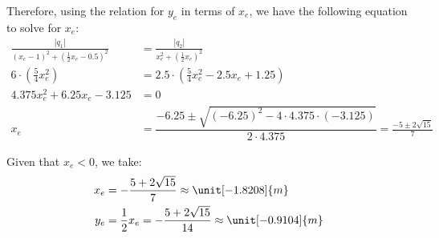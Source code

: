 \begin{ejercicio}
\begin{description}
        Therefore, using the relation for $y_e$ in terms of $x_e$, we have the following equation to solve for $x_e$:
        \begin{align*}
            \frac{|q_1|}{(x_e - 1)^2 + \left(\frac{1}{2} x_e - 0.5\right)^2} &= \frac{|q_2|}{x_e^2 + \left(\frac{1}{2} x_e\right)^2}\\
            6\cdot \left(\frac{5}{4} x_e^2\right) &= 2.5 \cdot \left( \frac{5}{4}x_e^2 -2.5 x_e + 1.25 \right)\\
            4.375 x_e^2 + 6.25 x_e - 3.125 &= 0\\
            x_e &= \dfrac{-6.25 \pm \sqrt{(-6.25)^2 - 4\cdot 4.375 \cdot (-3.125)}}{2\cdot 4.375} = \frac{-5\pm 2\sqrt{15}}{7}
        \end{align*}

        Given that $x_e<0$, we take:
        \begin{align*}
            x_e &= -\frac{5+ 2\sqrt{15}}{7} \approx \unit[-1.8208]{m}\\
            y_e &= \frac{1}{2} x_e = -\frac{5+ 2\sqrt{15}}{14} \approx \unit[-0.9104]{m}
        \end{align*}
    \end{description}
    
\end{ejercicio}


